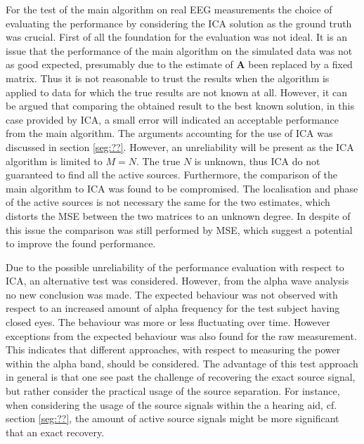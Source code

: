 For the test of the main algorithm on real EEG measurements the choice of evaluating the performance by considering the ICA solution as the ground truth was crucial.   
First of all the foundation for the evaluation was not ideal.  
It is an issue that the performance of the main algorithm on the simulated data was not as good expected, presumably due to the estimate of $\textbf{A}$ been replaced by a fixed matrix. 
Thus it is not reasonable to trust the results when the algorithm is applied to data for which the true results are not known at all. 
However, it can be argued that comparing the obtained result to the best known solution, in this case provided by ICA, a small error will indicated an acceptable performance from the main algorithm. 
The arguments accounting for the use of ICA was discussed in section \ref{seg:??}. However, an unreliability will be present as the ICA algorithm is limited to $M = N$. The true $N$ is unknown, thus ICA do not guaranteed to find all the active sources.
Furthermore, the comparison of the main algorithm to ICA was found to be compromised. The localisation and phase of the active sources is not necessary the same for the two estimates, which distorts the MSE between the two matrices to an unknown degree.
In despite of this issue the comparison was still performed by MSE, which suggest a potential to improve the found performance. 

Due to the possible unreliability of the performance evaluation with respect to ICA, an alternative test was considered. 
However, from the alpha wave analysis no new conclusion was made. The expected behaviour was not observed with respect to an increased amount of alpha frequency for the test subject having closed eyes. 
The behaviour was more or less fluctuating over time. However exceptions from the expected behaviour was also found for the raw measurement. This indicates that different approaches, with respect to measuring the power within the alpha band, should be considered.
The advantage of this test approach in general is that one see past the challenge of recovering the exact source signal, but rather consider the practical usage of the source separation. For instance, when considering the usage of the source signals within the a hearing aid, cf. section \ref{seg:??}, the amount of active source signals might be more significant that an exact recovery.             

